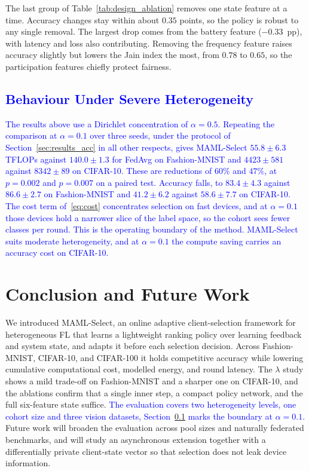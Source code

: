 \documentclass[journal]{IEEEtran}
\theoremstyle{remark}
\newcommand{\revision}[1]{#1}
\newcommand{\revtwo}[1]{\textcolor{blue}{#1}}
\begin{document}
\revision{The last group of Table~\ref{tab:design_ablation} removes one state feature at a time. Accuracy changes stay within about $0.35$ points, so the policy is robust to any single removal. The largest drop comes from the battery feature ($-0.33$~pp), with latency and loss also contributing. Removing the frequency feature raises accuracy slightly but lowers the Jain index the most, from $0.78$ to $0.65$, so the participation features chiefly protect fairness.}

\subsection{\revtwo{Behaviour Under Severe Heterogeneity}}\label{sec:alpha01}
\revtwo{The results above use a Dirichlet concentration of $\alpha=0.5$. Repeating the comparison at $\alpha=0.1$ over three seeds, under the protocol of Section~\ref{sec:results_acc} in all other respects, gives MAML-Select $55.8\pm6.3$ TFLOPs against $140.0\pm1.3$ for FedAvg on Fashion-MNIST and $4423\pm581$ against $8342\pm89$ on CIFAR-10. These are reductions of $60\%$ and $47\%$, at $p=0.002$ and $p=0.007$ on a paired test. Accuracy falls, to $83.4\pm4.3$ against $86.6\pm2.7$ on Fashion-MNIST and $41.2\pm6.2$ against $58.6\pm7.7$ on CIFAR-10. The cost term of~\eqref{eq:cost} concentrates selection on fast devices, and at $\alpha=0.1$ those devices hold a narrower slice of the label space, so the cohort sees fewer classes per round. This is the operating boundary of the method. MAML-Select suits moderate heterogeneity, and at $\alpha=0.1$ the compute saving carries an accuracy cost on CIFAR-10.}

\FloatBarrier
\section{Conclusion and Future Work}
\revision{We introduced MAML-Select, an online adaptive client-selection framework for heterogeneous FL that learns a lightweight ranking policy over learning feedback and system state, and adapts it before each selection decision.
Across Fashion-MNIST, CIFAR-10, and CIFAR-100 it holds competitive accuracy while lowering cumulative computational cost, modelled energy, and round latency. The $\lambda$ study shows a mild trade-off on Fashion-MNIST and a sharper one on CIFAR-10, and the ablations confirm that a single inner step, a compact policy network, and the full six-feature state suffice.} \revtwo{The evaluation covers two heterogeneity levels, one cohort size and three vision datasets, Section~\ref{sec:alpha01} marks the boundary at $\alpha=0.1$.} \revision{Future work will broaden the evaluation across pool sizes and naturally federated benchmarks, and will study an asynchronous extension together with a differentially private client-state vector so that selection does not leak device information.}
\end{document}
